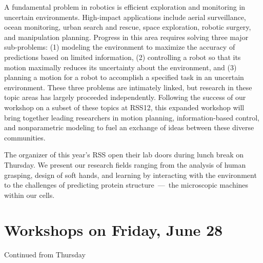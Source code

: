 \begin{spacing}{1.0}
{
A fundamental problem in robotics is efficient exploration and monitoring in uncertain environments. High-impact applications include aerial surveillance, ocean monitoring, urban search and rescue, space exploration, robotic surgery, and manipulation planning. Progress in this area requires solving three major sub-problems: (1) modeling the environment to maximize the accuracy of predictions based on limited information, (2) controlling a robot so that its motion maximally reduces its uncertainty about the environment, and (3) planning a motion for a robot to accomplish a specified task in an uncertain environment. These three problems are intimately linked, but research in these topic areas has largely proceeded independently. Following the success of our workshop on a subset of these topics at RSS12, this expanded workshop will bring together leading researchers in motion planning, information-based control, and nonparametric modeling to fuel an exchange of ideas between these diverse communities.
}


\vspace{2cm}
{
The organizer of this year's RSS open their lab doors during lunch break on Thursday.  We present our research fields ranging from the analysis of human grasping, design of soft hands, and learning by interacting with the environment to the challenges of predicting protein structure~---~the microscopic machines within our cells. 
}






\chapter{Workshops on Friday, June 28}

\vspace*{-2.0cm}


{
Continued from Thursday
}



\end{spacing}
